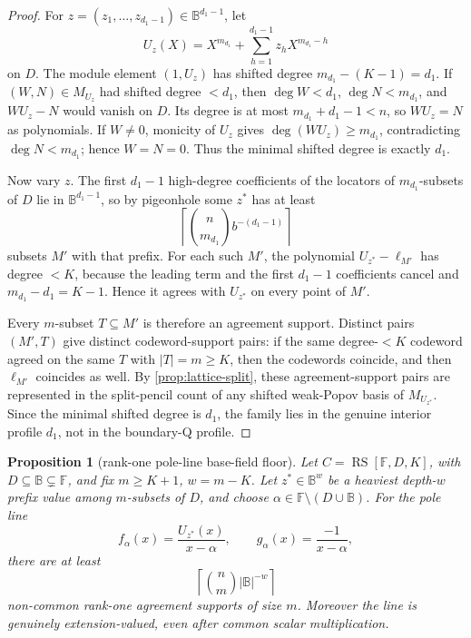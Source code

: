 \documentclass[a4paper,11pt]{amsart}
\newtheorem{proposition}[theorem]{Proposition}
\theoremstyle{remark}
\newcommand{\F}{\mathbb F}
\newcommand{\B}{\mathbb B}
\newcommand{\RS}{\operatorname{RS}}
\begin{document}
\begin{proof}
For \(z=(z_1,\ldots,z_{d_1-1})\in\B^{d_1-1}\), let
\[
        U_z(X)=X^{m_{d_1}}+\sum_{h=1}^{d_1-1}z_hX^{m_{d_1}-h}
\]
on \(D\).  The module element \((1,U_z)\) has shifted degree \(m_{d_1}-(K-1)=d_1\).  If \((W,N)\in M_{U_z}\) had shifted degree \(<d_1\), then \(\deg W<d_1\), \(\deg N<m_{d_1}\), and \(WU_z-N\) would vanish on \(D\).  Its degree is at most \(m_{d_1}+d_1-1<n\), so \(WU_z=N\) as polynomials.  If \(W\ne0\), monicity of \(U_z\) gives \(\deg(WU_z)\ge m_{d_1}\), contradicting \(\deg N<m_{d_1}\); hence \(W=N=0\).  Thus the minimal shifted degree is exactly \(d_1\).

Now vary \(z\).  The first \(d_1-1\) high-degree coefficients of the locators of \(m_{d_1}\)-subsets of \(D\) lie in \(\B^{d_1-1}\), so by pigeonhole some \(z^*\) has at least
\[
        \left\lceil\binom n{m_{d_1}}b^{-(d_1-1)}\right\rceil
\]
subsets \(M'\) with that prefix.  For each such \(M'\), the polynomial \(U_{z^*}-\ell_{M'}\) has degree \(<K\), because the leading term and the first \(d_1-1\) coefficients cancel and \(m_{d_1}-d_1=K-1\).  Hence it agrees with \(U_{z^*}\) on every point of \(M'\).

Every \(m\)-subset \(T\subseteq M'\) is therefore an agreement support.  Distinct pairs \((M',T)\) give distinct codeword-support pairs: if the same degree-\(<K\) codeword agreed on the same \(T\) with \(|T|=m\ge K\), then the codewords coincide, and then \(\ell_{M'}\) coincides as well.  By \cref{prop:lattice-split}, these agreement-support pairs are represented in the split-pencil count of any shifted weak-Popov basis of \(M_{U_{z^*}}\).  Since the minimal shifted degree is \(d_1\), the family lies in the genuine interior profile \(d_1\), not in the boundary-Q profile.
\end{proof}

\begin{proposition}[rank-one pole-line base-field floor]\label{prop:rank-one-floor}
Let \(C=\RS[\F,D,K]\), with \(D\subseteq\B\subsetneq\F\), and fix \(m\ge K+1\), \(w=m-K\).  Let \(z^*\in\B^w\) be a heaviest depth-\(w\) prefix value among \(m\)-subsets of \(D\), and choose \(\alpha\in\F\setminus(D\cup\B)\).  For the pole line
\[
        f_\alpha(x)=\frac{U_{z^*}(x)}{x-\alpha},\qquad
        g_\alpha(x)=\frac{-1}{x-\alpha},
\]
there are at least
\[
        \left\lceil\binom{n}{m}|\B|^{-w}\right\rceil
\]
non-common rank-one agreement supports of size \(m\).  Moreover the line is genuinely extension-valued, even after common scalar multiplication.
\end{proposition}
\end{document}
